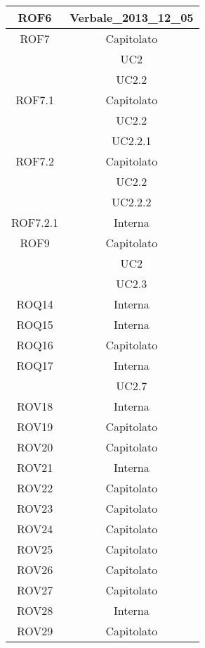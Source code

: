 \begin{longtable}{|c|c|}
\midrule
ROF6
& Verbale\_2013\_12\_05\\

\midrule
ROF7
& Capitolato\\
& UC2\\
& UC2.2\\

\midrule
ROF7.1
& Capitolato\\
& UC2.2\\
& UC2.2.1\\

\midrule
ROF7.2
& Capitolato\\
& UC2.2\\
& UC2.2.2\\

\midrule
ROF7.2.1
& Interna\\

\midrule
ROF9
& Capitolato\\
& UC2\\
& UC2.3\\

\midrule
ROQ14
& Interna\\

\midrule
ROQ15
& Interna\\

\midrule
ROQ16
& Capitolato\\

\midrule
ROQ17
& Interna\\
& UC2.7\\

\midrule
ROV18
& Interna\\

\midrule
ROV19
& Capitolato\\

\midrule
ROV20
& Capitolato\\

\midrule
ROV21
& Interna\\

\midrule
ROV22
& Capitolato\\

\midrule
ROV23
& Capitolato\\

\midrule
ROV24
& Capitolato\\

\midrule
ROV25
& Capitolato\\

\midrule
ROV26
& Capitolato\\

\midrule
ROV27
& Capitolato\\

\midrule
ROV28
& Interna\\

\midrule
ROV29
& Capitolato\\

\end{longtable}

